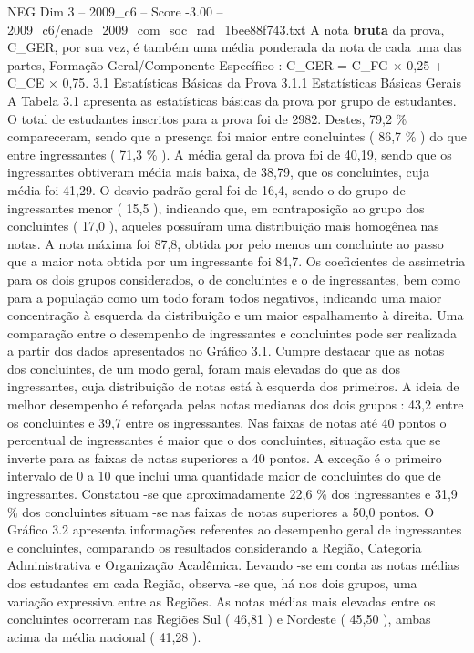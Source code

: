 \begin{textsample}{NEG Dim 3 – 2009\_c6 – Score -3.00 – 2009\_c6/enade\_2009\_com\_soc\_rad\_1bee88f743.txt}
A nota \textbf{bruta} da prova, C\_GER, por sua vez, é também uma média ponderada da nota de cada uma das partes, Formação Geral/Componente Específico : C\_GER = C\_FG × 0,25 + C\_CE × 0,75. 3.1 Estatísticas Básicas da Prova 3.1.1 Estatísticas Básicas Gerais A Tabela 3.1 apresenta as estatísticas básicas da prova por grupo de estudantes.
O total de estudantes inscritos para a prova foi de 2982.
Destes, 79,2 \% compareceram, sendo que a presença foi maior entre concluintes ( 86,7 \% ) do que entre ingressantes ( 71,3 \% ).
A média geral da prova foi de 40,19, sendo que os ingressantes obtiveram média mais baixa, de 38,79, que os concluintes, cuja média foi 41,29.
O desvio-padrão geral foi de 16,4, sendo o do grupo de ingressantes menor ( 15,5 ), indicando que, em contraposição ao grupo dos concluintes ( 17,0 ), aqueles possuíram uma distribuição mais homogênea nas notas.
A nota máxima foi 87,8, obtida por pelo menos um concluinte ao passo que a maior nota obtida por um ingressante foi 84,7.
Os coeficientes de assimetria para os dois grupos considerados, o de concluintes e o de ingressantes, bem como para a população como um todo foram todos negativos, indicando uma maior concentração à esquerda da distribuição e um maior espalhamento à direita.
Uma comparação entre o desempenho de ingressantes e concluintes pode ser realizada a partir dos dados apresentados no Gráfico 3.1.
Cumpre destacar que as notas dos concluintes, de um modo geral, foram mais elevadas do que as dos ingressantes, cuja distribuição de notas está à esquerda dos primeiros.
A ideia de melhor desempenho é reforçada pelas notas medianas dos dois grupos : 43,2 entre os concluintes e 39,7 entre os ingressantes.
Nas faixas de notas até 40 pontos o percentual de ingressantes é maior que o dos concluintes, situação esta que se inverte para as faixas de notas superiores a 40 pontos.
A exceção é o primeiro intervalo de 0 a 10 que inclui uma quantidade maior de concluintes do que de ingressantes.
Constatou -se que aproximadamente 22,6 \% dos ingressantes e 31,9 \% dos concluintes situam -se nas faixas de notas superiores a 50,0 pontos.
O Gráfico 3.2 apresenta informações referentes ao desempenho geral de ingressantes e concluintes, comparando os resultados considerando a Região, Categoria Administrativa e Organização Acadêmica.
Levando -se em conta as notas médias dos estudantes em cada Região, observa -se que, há nos dois grupos, uma variação expressiva entre as Regiões.
As notas médias mais elevadas entre os concluintes ocorreram nas Regiões Sul ( 46,81 ) e Nordeste ( 45,50 ), ambas acima da média nacional ( 41,28 ).

\end{textsample}
